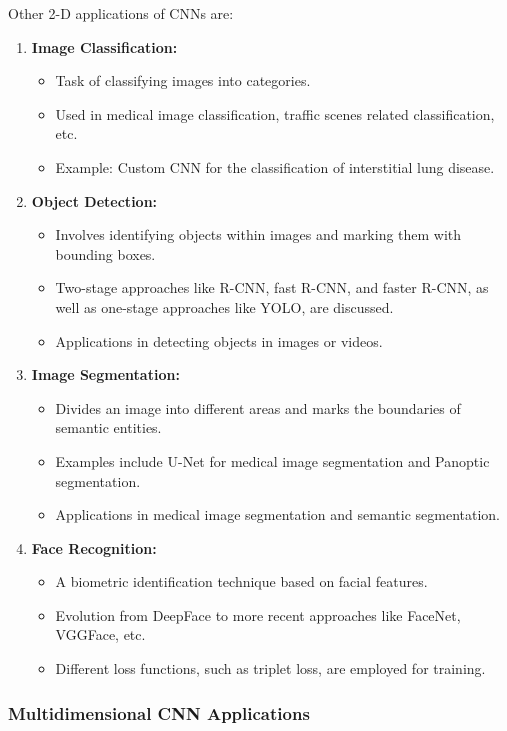 Other 2-D applications of CNNs are:

\begin{enumerate}
	\item \textbf{Image Classification:}
	\begin{itemize}
		\item Task of classifying images into categories.
		\item Used in medical image classification, traffic scenes related classification, etc.
		\item Example: Custom CNN for the classification of interstitial lung disease.
	\end{itemize}
	
	\item \textbf{Object Detection:}
	\begin{itemize}
		\item Involves identifying objects within images and marking them with bounding boxes.
		\item Two-stage approaches like R-CNN, fast R-CNN, and faster R-CNN, as well as one-stage approaches like YOLO, are discussed.
		\item Applications in detecting objects in images or videos.
	\end{itemize}
	
	\item \textbf{Image Segmentation:}
	\begin{itemize}
		\item Divides an image into different areas and marks the boundaries of semantic entities.
		\item Examples include U-Net for medical image segmentation and Panoptic segmentation.
		\item Applications in medical image segmentation and semantic segmentation.
	\end{itemize}
	
	\item \textbf{Face Recognition:}
	\begin{itemize}
		\item A biometric identification technique based on facial features.
		\item Evolution from DeepFace to more recent approaches like FaceNet, VGGFace, etc.
		\item Different loss functions, such as triplet loss, are employed for training.
	\end{itemize}
\end{enumerate}

\subsubsection{Multidimensional CNN Applications}

